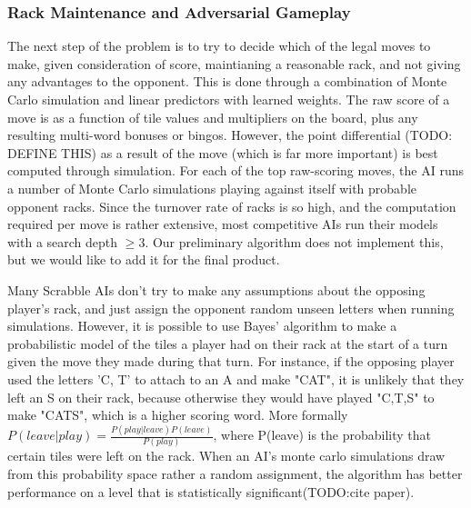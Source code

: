 \documentclass[12pt]{article}
\begin{document}
\subsubsection{Rack Maintenance and Adversarial Gameplay}
The next step of the problem is to try to decide which of the legal
moves to make, given consideration of score, maintianing a reasonable
rack, and not giving any advantages to the opponent. This is done
through a combination of Monte Carlo simulation and linear predictors
with learned weights. The raw score of a move is as a function of tile
values and multipliers on the board, plus any resulting multi-word
bonuses or bingos. However, the point differential (TODO: DEFINE THIS)
as a result of the move (which is far more important) is best computed
through simulation. For each of the top raw-scoring moves, the AI runs
a number of Monte Carlo simulations playing against itself with
probable opponent racks. Since the turnover rate of racks is so high,
and the computation required per move is rather extensive, most
competitive AIs run their models with a search depth $\geq 3$. Our
preliminary algorithm does not implement this, but we would like to
add it for the final product.

Many Scrabble AIs don't try to make any assumptions about the opposing
player's rack, and just assign the opponent random unseen letters when
running simulations. However, it is possible to use Bayes' algorithm
to make a probabilistic model of the tiles a player had on their rack
at the start of a turn given the move they made during that turn.%
For instance, if the opposing player used the letters 'C, T' to attach
to an A and make "CAT", it is unlikely that they left an S on their
rack, because otherwise they would have played "C,T,S" to make "CATS",
which is a higher scoring word. More formally $P(leave | play) =
\frac{P(play | leave)P(leave)}{P(play)}$, where P(leave) is the
probability that certain tiles were left on the rack. When an AI's
monte carlo simulations draw from this probability space rather a
random assignment, the algorithm has better performance on a level
that is statistically significant(TODO:cite paper).

	
\end{document}
